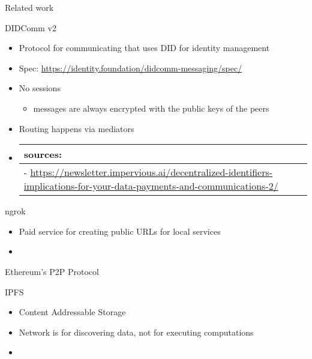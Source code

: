\begin{frame}[fragile]{Related work}
\begin{block}{DIDComm v2}
\protect\hypertarget{didcomm-v2}{}
\begin{itemize}
\item
  Protocol for communicating that uses DID for identity management
\item
  Spec: \url{https://identity.foundation/didcomm-messaging/spec/}
\item
  No sessions

  \begin{itemize}
  \tightlist
  \item
    messages are always encrypted with the public keys of the peers
  \end{itemize}
\item
  Routing happens via mediators
\item
  \begin{longtable}[]{@{}l@{}}
  \toprule()
  sources: \\
  \midrule()
  \endhead
  -
  \url{https://newsletter.impervious.ai/decentralized-identifiers-implications-for-your-data-payments-and-communications-2/} \\
  \bottomrule()
  \end{longtable}
\end{itemize}
\end{block}

\begin{block}{ngrok}
\protect\hypertarget{ngrok}{}
\begin{itemize}
\tightlist
\item
  Paid service for creating public URLs for local services
\item
\end{itemize}
\end{block}

\begin{block}{Ethereum's P2P Protocol}
\protect\hypertarget{ethereums-p2p-protocol}{}
\end{block}

\begin{block}{IPFS}
\protect\hypertarget{ipfs}{}
\begin{itemize}
\tightlist
\item
  Content Addressable Storage
\item
  Network is for discovering data, not for executing computations
\item
\end{itemize}
\end{block}


\end{frame}
